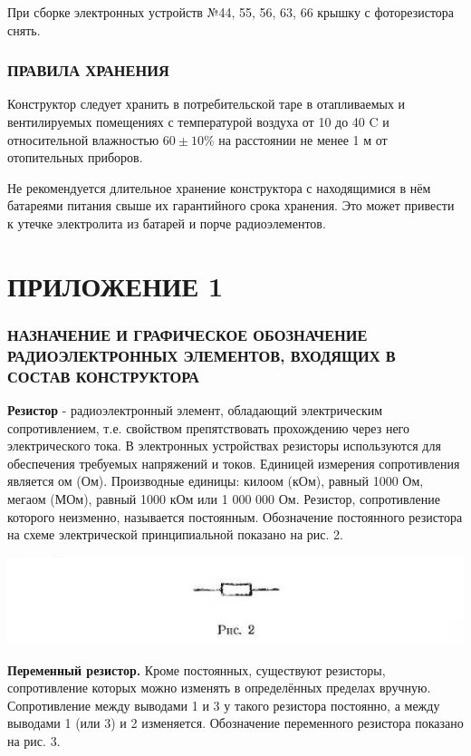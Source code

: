 \documentclass[12pt]{article}
\begin{document}
При сборке электронных устройств №44, 55, 56, 63, 66 крышку с фоторезистора снять.

\section{ПРАВИЛА ХРАНЕНИЯ}
Конструктор следует хранить в потребительской таре в отапливаемых и вентилируемых помещениях с температурой воздуха от 10 до 40 \degree C и относительной влажностью $60\pm 10\%$ на расстоянии не менее 1 м от отопительных приборов.

Не рекомендуется длительное хранение конструктора с находящимися в нём батареями питания свыше их гарантийного срока хранения. Это может привести к утечке электролита из батарей и порче радиоэлементов.
\newpage
\part{ПРИЛОЖЕНИЕ 1}
\vspace*{4em}
\section{НАЗНАЧЕНИЕ И ГРАФИЧЕСКОЕ ОБОЗНАЧЕНИЕ РАДИОЭЛЕКТРОННЫХ ЭЛЕМЕНТОВ, ВХОДЯЩИХ В СОСТАВ КОНСТРУКТОРА}

\textbf{Резистор} - радиоэлектронный элемент, обладающий электрическим сопротивлением, т.е. свойством препятствовать прохождению через него электрического тока. В электронных устройствах резисторы используются для обеспечения требуемых напряжений и токов. Единицей измерения сопротивления является ом (Ом). Производные единицы: килоом (кОм), равный 1000 Ом, мегаом (МОм), равный 1000 кОм или 1 000 000 Ом. Резистор, сопротивление которого неизменно, называется постоянным. Обозначение постоянного резистора на схеме электрической принципиальной показано на рис. 2.

\includegraphics[scale=0.8]{ekon3_008_1}

\textbf{Переменный резистор.} Кроме постоянных, существуют резисторы, сопротивление которых можно изменять в определённых пределах вручную. Сопротивление между выводами 1 и 3 у такого резистора постоянно, а между выводами 1 (или 3) и 2 изменяется. Обозначение переменного резистора показано на рис. 3.
\end{document}
